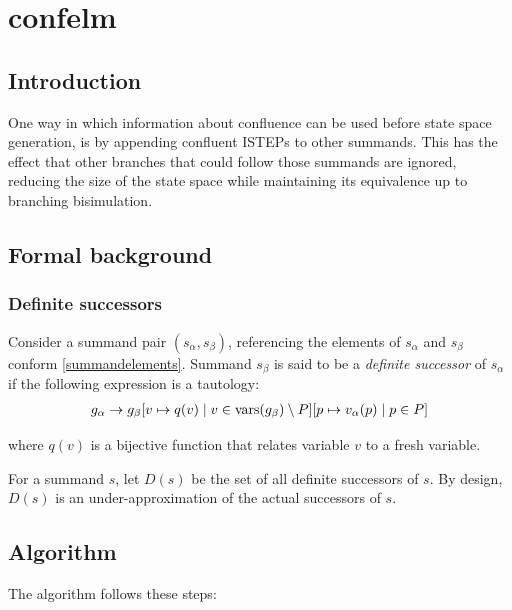 \chapter{confelm}

\section{Introduction}
One way in which information about confluence can be used before state space generation, is by appending confluent ISTEPs to other summands.
This has the effect that other branches that could follow those summands are ignored, reducing the size of the state space while maintaining its equivalence up to branching bisimulation.

\section{Formal background}

\subsection{Definite successors}

Consider a summand pair $(s_\alpha, s_\beta)$, referencing the elements of $s_\alpha$ and $s_\beta$ conform \ref{summandelements}.
Summand $s_\beta$ is said to be a \emph{definite successor} of $s_\alpha$ if the following expression is a tautology:
\begin{align*}
g_\alpha \rightarrow {g_\beta}[v \mapsto q(v) \;|\; v \in \text{vars}(g_\beta) \setminus P][p \mapsto v_\alpha(p) \;|\; p \in P]
\end{align*}

where $q(v)$ is a bijective function that relates variable $v$ to a fresh variable.

For a summand $s$, let $D(s)$ be the set of all definite successors of $s$.
By design, $D(s)$ is an under-approximation of the actual successors of $s$.

\section{Algorithm}

The algorithm follows these steps:

